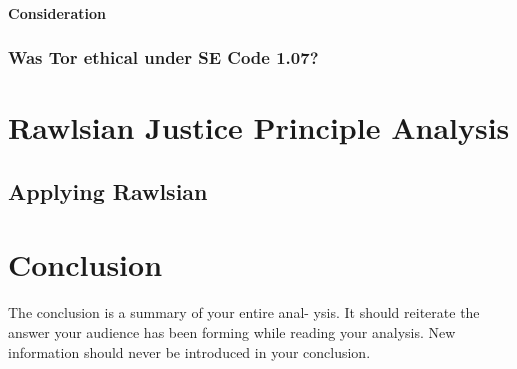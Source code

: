 \documentclass[11pt]{article}
\begin{document}
\begin{multicols}{2}
\paragraph{Consideration}


\subsubsection{Was Tor ethical under SE Code 1.07?}

\section{Rawlsian Justice Principle Analysis}


\subsection{Applying Rawlsian}


\section{Conclusion} The conclusion is a summary of your entire anal- ysis. It
should reiterate the answer your audience has been forming while reading your
analysis. New information should never be introduced in your conclusion.
\cite{texTemp}

\end{multicols} \newpage

\nocite{*}




\end{document}
